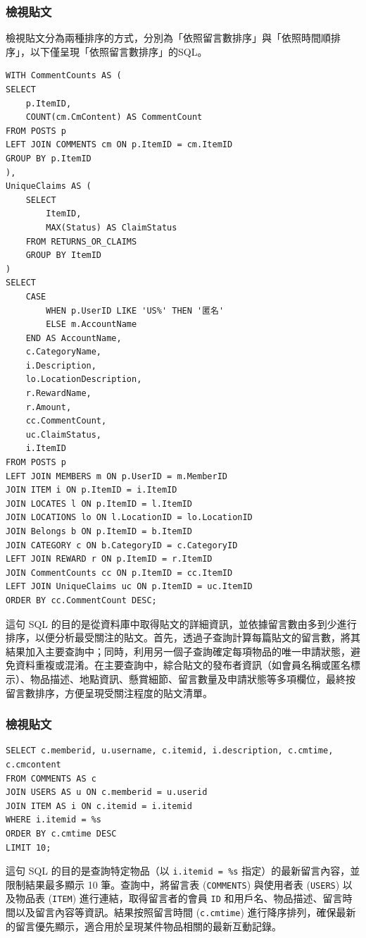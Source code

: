 \documentclass[12pt,a4paper]{article}
\begin{document}
\subsubsection{檢視貼文}
檢視貼文分為兩種排序的方式，分別為「依照留言數排序」與「依照時間順排序」，以下僅呈現「依照留言數排序」的SQL。
\begin{lstlisting}
WITH CommentCounts AS (
SELECT 
    p.ItemID,
    COUNT(cm.CmContent) AS CommentCount
FROM POSTS p
LEFT JOIN COMMENTS cm ON p.ItemID = cm.ItemID
GROUP BY p.ItemID
),
UniqueClaims AS (
    SELECT 
        ItemID,
        MAX(Status) AS ClaimStatus
    FROM RETURNS_OR_CLAIMS
    GROUP BY ItemID
)
SELECT 
    CASE 
        WHEN p.UserID LIKE 'US%' THEN '匿名'
        ELSE m.AccountName
    END AS AccountName,
    c.CategoryName, 
    i.Description, 
    lo.LocationDescription, 
    r.RewardName, 
    r.Amount,
    cc.CommentCount,
    uc.ClaimStatus,
    i.ItemID
FROM POSTS p
LEFT JOIN MEMBERS m ON p.UserID = m.MemberID
JOIN ITEM i ON p.ItemID = i.ItemID
JOIN LOCATES l ON p.ItemID = l.ItemID
JOIN LOCATIONS lo ON l.LocationID = lo.LocationID
JOIN Belongs b ON p.ItemID = b.ItemID
JOIN CATEGORY c ON b.CategoryID = c.CategoryID
LEFT JOIN REWARD r ON p.ItemID = r.ItemID
JOIN CommentCounts cc ON p.ItemID = cc.ItemID
LEFT JOIN UniqueClaims uc ON p.ItemID = uc.ItemID
ORDER BY cc.CommentCount DESC;   
\end{lstlisting}

這句 SQL 的目的是從資料庫中取得貼文的詳細資訊，並依據留言數由多到少進行排序，以便分析最受關注的貼文。首先，透過子查詢計算每篇貼文的留言數，將其結果加入主要查詢中；同時，利用另一個子查詢確定每項物品的唯一申請狀態，避免資料重複或混淆。在主要查詢中，綜合貼文的發布者資訊（如會員名稱或匿名標示）、物品描述、地點資訊、懸賞細節、留言數量及申請狀態等多項欄位，最終按留言數排序，方便呈現受關注程度的貼文清單。

\subsubsection{檢視貼文}
\begin{lstlisting}
SELECT c.memberid, u.username, c.itemid, i.description, c.cmtime, c.cmcontent
FROM COMMENTS AS c
JOIN USERS AS u ON c.memberid = u.userid
JOIN ITEM AS i ON c.itemid = i.itemid
WHERE i.itemid = %s
ORDER BY c.cmtime DESC
LIMIT 10;
\end{lstlisting}

這句 SQL 的目的是查詢特定物品（以 \texttt{i.itemid = \%s} 指定）的最新留言內容，並限制結果最多顯示 10 筆。查詢中，將留言表 (\texttt{COMMENTS}) 與使用者表 (\texttt{USERS}) 以及物品表 (\texttt{ITEM}) 進行連結，取得留言者的會員 \texttt{ID} 和用戶名、物品描述、留言時間以及留言內容等資訊。結果按照留言時間 (\texttt{c.cmtime}) 進行降序排列，確保最新的留言優先顯示，適合用於呈現某件物品相關的最新互動記錄。
\end{document}
